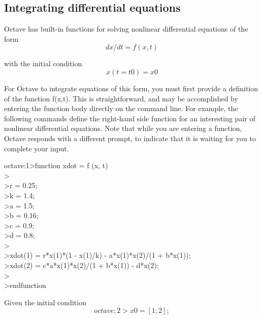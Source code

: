 \documentclass[a4paper,12pt]{article}
\begin{document}
\subsection{Integrating differential equations}
\justifying
\par
Octave has built-in functions for solving nonlinear differential equations of the form
\begin{equation}
    \label{simple_equation}
	dx/dt = f (x, t)	
\end{equation}
\par
with the initial condition
\begin{equation}
    \label{simple_equation}
	x(t = t0) = x0
\end{equation}
\par
For Octave to integrate equations of this form, you must first provide a definition of the function f(x,t). This is straightforward, and may be accomplished by entering the function body directly on the command line. For example, the following commands define the right-hand side function for an interesting pair of nonlinear differential equations. Note that while you are entering a function, Octave responds with a different prompt, to indicate that it is waiting for you to complete your input.
\begin{flushleft}
	octave:1\textgreater function xdot = f (x, t)\\
	\textgreater\\
	\textgreater  r = 0.25;\\
	\textgreater  k = 1.4;\\
	\textgreater  a = 1.5;\\
	\textgreater  b = 0.16;\\
	\textgreater  c = 0.9;\\
	\textgreater  d = 0.8;\\
	\textgreater \\
	\textgreater  xdot(1) = r*x(1)*(1 - x(1)/k) - a*x(1)*x(2)/(1 + b*x(1));\\
	\textgreater  xdot(2) = c*a*x(1)*x(2)/(1 + b*x(1)) - d*x(2);\\
	\textgreater \\
	\textgreater endfunction\\
\end{flushleft}
\par
	Given the initial condition
\begin{equation}
    \label{simple_equation}
	octave:2> x0 = [1; 2];
\end{equation}
\par
\end{document}
